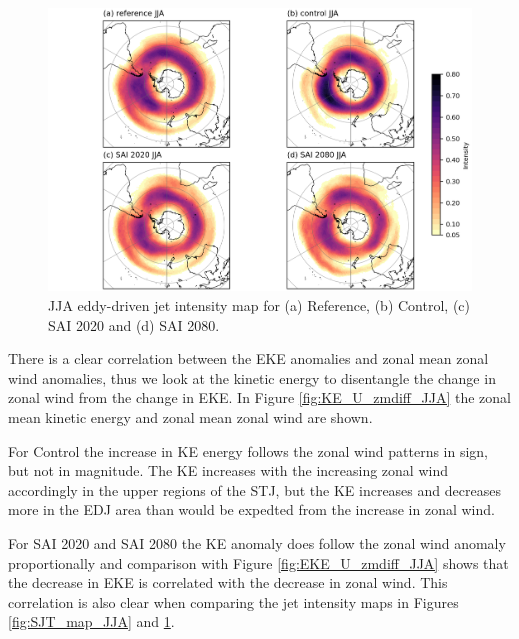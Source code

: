 \begin{figure}[H]
	\centering
	\includegraphics[width=0.95\linewidth]{images/EDJ_map_JJA.png}
	\caption{JJA eddy-driven jet intensity map for (a) Reference, (b) Control, (c) SAI 2020 and (d) SAI 2080.}
	\label{fig:EDJ_map_JJA}
\end{figure}

There is a clear correlation between the EKE anomalies and zonal mean zonal wind anomalies, thus we look at the kinetic energy to disentangle the change in zonal wind from the change in EKE. In Figure \ref{fig:KE_U_zmdiff_JJA} the zonal mean kinetic energy and zonal mean zonal wind are shown. 

For Control the increase in KE energy follows the zonal wind patterns in sign, but not in magnitude. The KE increases with the increasing zonal wind accordingly in the upper regions of the STJ, but the KE increases and decreases more in the EDJ area than would be expedted from the increase in zonal wind. 

For SAI 2020 and SAI 2080 the KE anomaly does follow the zonal wind anomaly proportionally and comparison with Figure \ref{fig:EKE_U_zmdiff_JJA} shows that the decrease in EKE is correlated with the decrease in zonal wind. This correlation is also clear when comparing the jet intensity maps in Figures \ref{fig:SJT_map_JJA} and \ref{fig:EDJ_map_JJA}.

